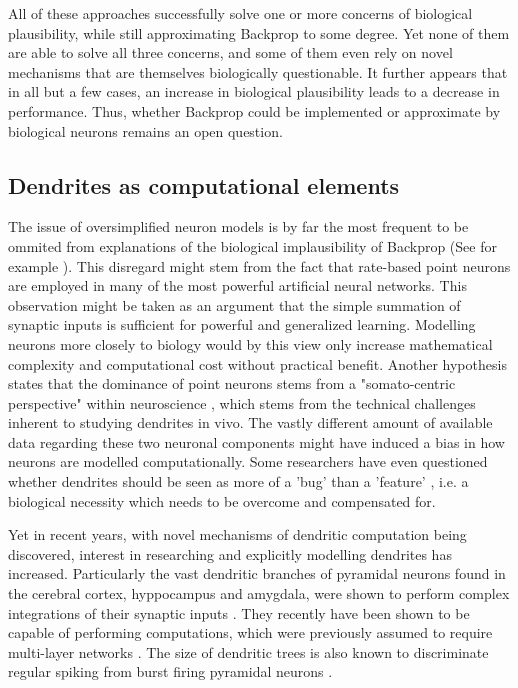 All of these approaches successfully solve one or more concerns of biological plausibility, while still approximating
Backprop to some degree. Yet none of them are able to solve all three concerns, and some of them even rely on novel
mechanisms that are themselves biologically questionable. It further appears that in all but a few cases, an increase in
biological plausibility leads to a decrease in performance. Thus, whether Backprop could be implemented or approximate
by biological neurons remains an open question.

\subsection{Dendrites as computational elements}

The issue of oversimplified neuron models is by far the most frequent to be ommited from explanations of the biological
implausibility of Backprop (See for example \citep{Meulemans2020,Lillicrap2014}). This disregard might stem from the
fact that rate-based point neurons are employed in many of the most powerful artificial neural networks. This
observation might be taken as an argument that the simple summation of synaptic inputs is sufficient for powerful and
generalized learning. Modelling neurons more closely to biology would by this view only increase mathematical complexity
and computational cost without practical benefit. Another hypothesis states that the dominance of point neurons stems
from a "somato-centric perspective" within neuroscience \citep{Larkum2018}, which stems from the technical challenges
inherent to studying dendrites in vivo. The vastly different amount of available data regarding these two neuronal
components might have induced a bias in how neurons are modelled computationally. Some researchers have even questioned
whether dendrites should be seen as more of a 'bug' than a 'feature' \citep{Haeusser2003}, i.e. a biological necessity
which needs to be overcome and compensated for.

Yet in recent years, with novel mechanisms of dendritic computation being discovered, interest in researching and
explicitly modelling dendrites has increased. Particularly the vast dendritic branches of pyramidal neurons found in the
cerebral cortex, hyppocampus and amygdala, were shown to perform complex integrations of their synaptic inputs
\citep{spruston2008pyramidal}. They recently have been shown to be capable of performing computations, which were
previously assumed to require multi-layer networks \citep{Schiess2016,Gidon2020}. The size of dendritic trees is also
known to discriminate regular spiking from burst firing pyramidal neurons \citep{Elburg2010}. 


